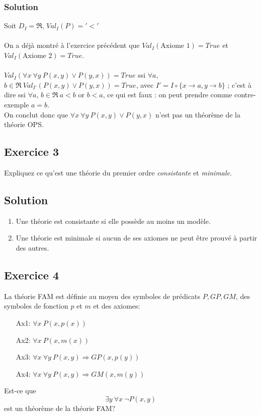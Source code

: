     \subsubsection*{Solution}
    \noindent Soit $D_I = \Re$, $Val_I(P) = '<'$\\
    \\
    On a déjà montré à l'exercice précédent que $Val_I (\text{Axiome 1}) = True$ et $Val_I (\text{Axiome 2}) = True$.\\
    \\
    $Val_I (\forall x \ \forall y \ P(x, y) \lor P(y, x)) = True$ ssi $\forall a$, $b \in \Re \ Val_{I'}(P(x, y) \lor P(y, x)) = True$, avec $I' = I \circ \{x \rightarrow a, y \rightarrow b\}$ ; c'est à dire ssi $\forall a$, $b \in \Re \ a<b$ or $b<a$, ce qui est faux : on peut prendre comme contre-exemple $a = b$.\\
    On conclut donc que $\forall x \ \forall y \ P(x, y) \lor P(y, x)$ n'est pas un théorème de la théorie OPS.


\subsection*{Exercice 3}
Expliquez ce qu'est une th\'{e}orie du premier ordre \textit{consistante} et \textit{minimale}.%

    \subsection*{Solution}
    \begin{enumerate}
    \item Une théorie est consistante si elle possède au moins un modèle.
    \item Une théorie est minimale si aucun de ses axiomes ne peut être prouvé à partir des autres.
    \end{enumerate}

\subsection*{Exercice 4}
La th\'{e}orie FAM est d\'{e}finie au moyen des symboles de pr\'{e}dicats $P, GP, GM$, des symboles de fonction $p$ et $m$ et des axiomes:
\begin{enumerate}
\item[Ax1:] $\forall x \ P(x, p(x))$
\item[Ax2:] $\forall x \ P(x, m(x))$
\item[Ax3:] $\forall x \ \forall y \ P(x, y) \Rightarrow GP(x, p(y))$
\item[Ax4:] $\forall x \ \forall y \ P(x, y) \Rightarrow GM(x, m(y))$
\end{enumerate}
Est-ce que
$$
\exists y \ \forall x \ \neg P(x, y)
$$
est un th\'{e}or\`{e}me de la th\'{e}orie FAM?


